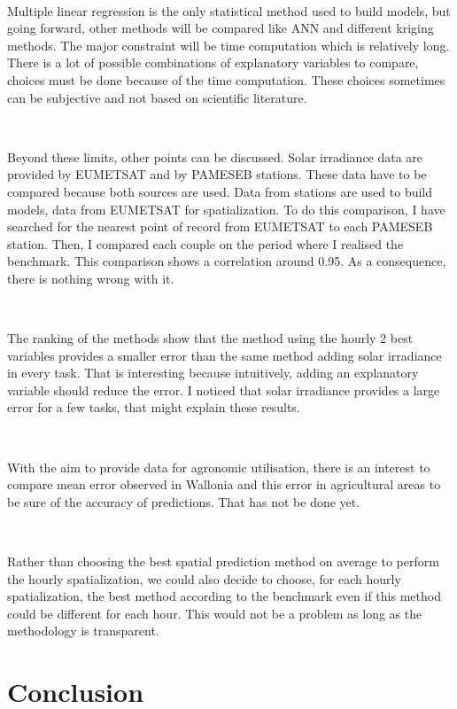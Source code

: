 \documentclass[12pt,twoside]{reedthesis}
\theoremstyle{definition}
\theoremstyle{definition}
\theoremstyle{definition}
\theoremstyle{remark}
\begin{document}
~

Multiple linear regression is the only statistical method used to build
models, but going forward, other methods will be compared like ANN and
different kriging methods. The major constraint will be time computation
which is relatively long. There is a lot of possible combinations of
explanatory variables to compare, choices must be done because of the
time computation. These choices sometimes can be subjective and not
based on scientific literature.

~

Beyond these limits, other points can be discussed. Solar irradiance
data are provided by EUMETSAT and by PAMESEB stations. These data have
to be compared because both sources are used. Data from stations are
used to build models, data from EUMETSAT for spatialization. To do this
comparison, I have searched for the nearest point of record from
EUMETSAT to each PAMESEB station. Then, I compared each couple on the
period where I realised the benchmark. This comparison shows a
correlation around 0.95. As a consequence, there is nothing wrong with
it.

~

The ranking of the methods show that the method using the hourly 2 best
variables provides a smaller error than the same method adding solar
irradiance in every task. That is interesting because intuitively,
adding an explanatory variable should reduce the error. I noticed that
solar irradiance provides a large error for a few tasks, that might
explain these results.

~

With the aim to provide data for agronomic utilisation, there is an
interest to compare mean error observed in Wallonia and this error in
agricultural areas to be sure of the accuracy of predictions. That has
not be done yet.

~

Rather than choosing the best spatial prediction method on average to
perform the hourly spatialization, we could also decide to choose, for
each hourly spatialization, the best method according to the benchmark
even if this method could be different for each hour. This would not be
a problem as long as the methodology is transparent.

\chapter*{Conclusion}\label{conclusion}
\end{document}
